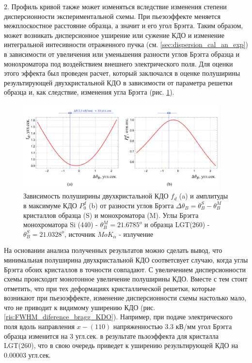 2. Профиль кривой также может изменяться вследствие изменения степени
 дисперсионности экспериментальной схемы.
При пьезоэффекте меняется межплоскостное расстояние образца, а значит и его угол Брэгга.
Таким образом, может возникать дисперсионное уширение или сужение КДО и изменение интегральной интесивности
отраженного пучка (см. \ref{sec:dispersion_cal_an_exp}) в зависимости
от увеличения или уменьшения разности углов Брэгга образца и монохроматора
под воздействием внешнего электрического поля. Для оценки этого эффекта был
проведен расчет, который заключался в оценке полуширины результирующей двухкристальной КДО
в зависимости от параметра решетки образца и, как следствие,
 изменения угла Брэгга (рис. \ref{ris:FWHM_diference_bragg}).
\begin{figure}[H]
  \centering
  \includegraphics[width=0.95\textwidth]{images/delta_bragg_dispers.png}
  \caption{Зависимость полуширины двухкристальной КДО $f_d$ (a) и амплитуды в максимуме КДО  $P^d_0$ (b)
   от разности углов Брэгга $\Delta\theta_B =\theta_B^S-\theta_B^M $ кристаллов
  образца (S) и монохроматора (M). Углы Брэгга монохроматора Si (440) - $\theta_B^M = 21.6785 ^o$ и
   образца LGT(260) - $\theta_B^S = 21.0328 ^o$, источник $MoK_{\alpha}$ - излучение}
  \label{ris:FWHM_diference_bragg}
\end{figure}

На основании анализа полученных результатов можно сделать вывод, что минимальная полуширина
двухкристальной КДО соответсвует случаю, когда углы Брэгга обоих кристаллов в точности совпадают. С увеличением
дисперсионности схемы происходит монотонное увеличение полуширины КДО. Вместе с тем стоит отметить,
что при тех деформациях кристаллической решетки, которые возникают при пьезоэффекте,
изменение дисперсионности схемы настолько мало, что не приводит к видимому уширению КДО (рис. \ref{ris:FWHM_diference_bragg_KDO}).
Например, при подаче электрического поля вдоль направления $x - (110)$ напряженностью $3.3$ кВ/мм угол Брэгга
образца изменится на 3 угл.сек. в результате пьзоэффекта для кристалла LGT(260), что в свою очередь
приведет к уширению результирующей КДО на 0.00003 угл.сек.

